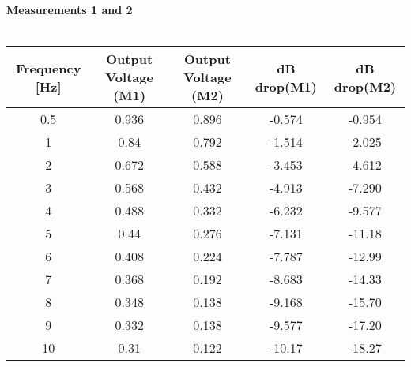 \documentclass[12pt,twoside]{article}
\begin{document}
\textbf{Measurements 1 and 2}\\\\
{
\centering
 \begin{tabular}{|c |c |c |c |c|} 
 \hline
Frequency [Hz] & Output Voltage (M1)  &Output Voltage (M2) & dB drop(M1)&dB drop(M2) \\ 
 \hline
 0.5& 0.936 & 0.896 & -0.574 & -0.954 \\ 
 \hline
 1 & 0.84 & 0.792 & -1.514&-2.025 \\
 \hline
 2 & 0.672 & 0.588 & -3.453 &-4.612 \\
 \hline
 3 & 0.568 & 0.432 & -4.913&-7.290 \\
 \hline
 4 & 0.488 & 0.332 & -6.232 &-9.577 \\
 \hline
 5 & 0.44 & 0.276 & -7.131&-11.18 \\
 \hline
 6 &0.408 & 0.224 & -7.787&-12.99 \\
 \hline
 7 & 0.368 & 0.192 & -8.683&-14.33 \\
 \hline
 8 & 0.348&0.138&-9.168&-15.70\\
 \hline
 9 & 0.332&0.138&-9.577&-17.20 \\
 \hline
 10 & 0.31 & 0.122 & -10.17&-18.27 \\
 \hline
\end{tabular}
}\\\\
\end{document}
